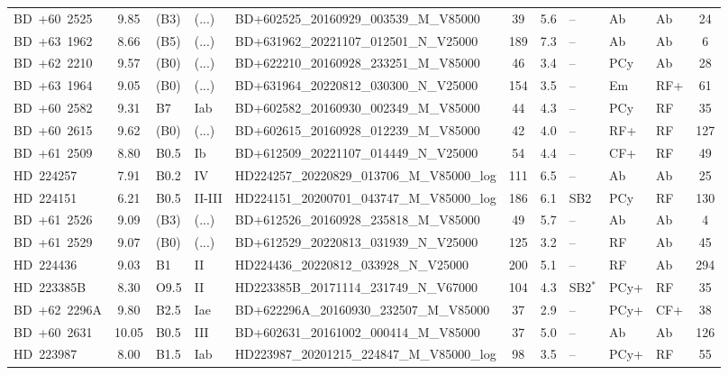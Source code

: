 {\begin{landscape}
\begin{longtable}{lclllcclllc}
\noalign{\smallskip}
BD~+60~2525 & 9.85 & (B3) & (...) & BD+602525\_20160929\_003539\_M\_V85000 & 39 & 5.6 & -- & Ab & Ab & 24 \\
\noalign{\smallskip}
BD~+63~1962 & 8.66 & (B5) & (...) & BD+631962\_20221107\_012501\_N\_V25000 & 189 & 7.3 & -- & Ab & Ab & 6 \\
\noalign{\smallskip}
BD~+62~2210 & 9.57 & (B0) & (...) & BD+622210\_20160928\_233251\_M\_V85000 & 46 & 3.4 & -- & PCy & Ab & 28 \\
\noalign{\smallskip}
BD~+63~1964 & 9.05 & (B0) & (...) & BD+631964\_20220812\_030300\_N\_V25000 & 154 & 3.5 & -- & Em & RF+ & 61 \\
\noalign{\smallskip}
BD~+60~2582 & 9.31 & B7 & Iab & BD+602582\_20160930\_002349\_M\_V85000 & 44 & 4.3 & -- & PCy & RF & 35 \\
\noalign{\smallskip}
BD~+60~2615 & 9.62 & (B0) & (...) & BD+602615\_20160928\_012239\_M\_V85000 & 42 & 4.0 & -- & RF+ & RF & 127 \\
\noalign{\smallskip}
BD~+61~2509 & 8.80 & B0.5 & Ib & BD+612509\_20221107\_014449\_N\_V25000 & 54 & 4.4 & -- & CF+ & RF & 49 \\
\noalign{\smallskip}
HD~224257 & 7.91 & B0.2 & IV & HD224257\_20220829\_013706\_M\_V85000\_log & 111 & 6.5 & -- & Ab & Ab & 25 \\
\noalign{\smallskip}
HD~224151 & 6.21 & B0.5 & II-III & HD224151\_20200701\_043747\_M\_V85000\_log & 186 & 6.1 & SB2 & PCy & RF & 130 \\
\noalign{\smallskip}
BD~+61~2526 & 9.09 & (B3) & (...) & BD+612526\_20160928\_235818\_M\_V85000 & 49 & 5.7 & -- & Ab & Ab & 4 \\
\noalign{\smallskip}
BD~+61~2529 & 9.07 & (B0) & (...) & BD+612529\_20220813\_031939\_N\_V25000 & 125 & 3.2 & -- & RF & Ab & 45 \\
\noalign{\smallskip}
HD~224436 & 9.03 & B1 & II & HD224436\_20220812\_033928\_N\_V25000 & 200 & 5.1 & -- & RF & Ab & 294 \\
\noalign{\smallskip}
HD~223385B & 8.30 & O9.5 & II & HD223385B\_20171114\_231749\_N\_V67000 & 104 & 4.3 & SB2$^{*}$ & PCy+ & RF & 35 \\
\noalign{\smallskip}
BD~+62~2296A & 9.80 & B2.5 & Iae & BD+622296A\_20160930\_232507\_M\_V85000 & 37 & 2.9 & -- & PCy+ & CF+ & 38 \\
\noalign{\smallskip}
BD~+60~2631 & 10.05 & B0.5 & III & BD+602631\_20161002\_000414\_M\_V85000 & 37 & 5.0 & -- & Ab & Ab & 126 \\
\noalign{\smallskip}
HD~223987 & 8.00 & B1.5 & Iab & HD223987\_20201215\_224847\_M\_V85000\_log & 98 & 3.5 & -- & PCy+ & RF & 55 \\

\end{longtable}
\end{landscape}}

